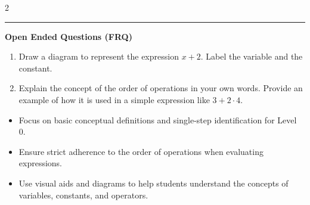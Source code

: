 \documentclass[10pt]{article}
\begin{document}
\begin{multicols}{2}
\begin{enumerate}[label=\textbf{Q\arabic*.}, leftmargin=*, itemsep=6pt, parsep=0pt]
\end{enumerate}
\end{multicols}

\vspace{-0.2cm}
\hrule
\vspace{0.2cm}
\textbf{\small Open Ended Questions (FRQ)}
\begin{enumerate}[label=\textbf{Q\arabic*.}, start=9, itemsep=5pt, topsep=0pt]

  \item \small Draw a diagram to represent the expression $x + 2$. Label the variable and the constant. \vspace{2cm}

  \item \small Explain the concept of the order of operations in your own words. Provide an example of how it is used in a simple expression like $3 + 2 \cdot 4$. \vspace{4cm}

\end{enumerate}

\vfill

\begin{tcolorbox}[colback=blue!5, colframe=mainblue!50, title=\small \textbf{Chef's Tips}, fonttitle=\bfseries, bottom=1mm]
\begin{itemize}[noitemsep, topsep=2pt, leftmargin=0.5cm]
  \item \scriptsize Focus on basic conceptual definitions and single-step identification for Level 0.\item \scriptsize Ensure strict adherence to the order of operations when evaluating expressions.\item \scriptsize Use visual aids and diagrams to help students understand the concepts of variables, constants, and operators.
\end{itemize}
\end{tcolorbox}
\end{document}
